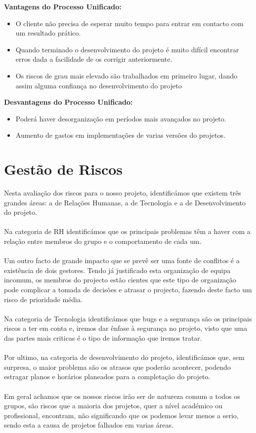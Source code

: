 \documentclass[12pt, a4paper, twoside]{report} %
\begin{document}
\textbf{Vantagens do Processo Unificado:}
\begin{itemize}
\item O cliente não precisa de esperar muito tempo para entrar em contacto com um resultado prático.
\item Quando terminado o desenvolvimento do projeto é muito difícil encontrar erros dada a facilidade de os corrigir anteriormente.
\item Os riscos de grau mais elevado são trabalhados em primeiro lugar, dando assim alguma confiança no desenvolvimento do projeto
\end{itemize}

\textbf{Desvantagens do Processo Unificado:}
\begin{itemize}
\item Poderá haver desorganização em períodos mais avançados no projeto.
\item Aumento de gastos em implementações de varias versões do projetos.
\end{itemize}


\clearpage

\section{Gestão de Riscos}

Nesta avaliação dos riscos para o nosso projeto, identificámos que existem três grandes áreas: a de Relações Humanas, a de Tecnologia e a de Desenvolvimento do projeto.
\\
\\ 
Na categoria de RH identificámos que os principais problemas têm a haver com a relação entre membros do grupo e o comportamento de cada um.
\\
\\
Um outro facto de grande impacto que se prevê ser uma fonte de conflitos é a existência de dois gestores. Tendo já justificado esta organização de equipa incomum, os membros do projecto estão cientes que este tipo de organização pode complicar a tomada de decisões e atrasar o projecto, fazendo deste facto um risco de prioridade média.
\\
\\
Na categoria de Tecnologia identificámos que bugs e a segurança são os principais riscos a ter em conta e, iremos dar ênfase à segurança no projeto, visto que uma das partes mais criticas é o tipo de informação que iremos tratar.\\\\ Por ultimo, na categoria de desenvolvimento do projeto, identificámos que, sem surpresa, o maior problema são os atrasos que poderão acontecer, podendo estragar planos e horários planeados para a completação do projeto.\\\\ Em geral achamos que os nossos riscos irão ser de natureza comum a todos os grupos, são riscos que a maioria dos projetos, quer a nível académico ou profissional, encontram, não significando que os podemos levar menos a serio, sendo esta a causa de projetos falhados em varias áreas.
\end{document}
